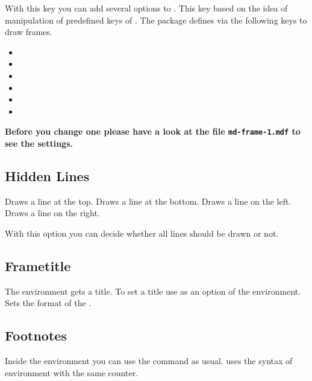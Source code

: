 \documentclass[parskip=false,english,11pt]{ltxmdf}
\begin{document}
 With this key you can add several options to . This key based on the idea of manipulation of predefined keys of \mdname.
The package \mdname defines via  the following keys to draw frames.
\begin{itemize}
 \item {}
 \item {}
 \item {}
 \item {}
 \item {}
 \item {}
\end{itemize}
\textbf{Before you change one please have a look at the file \texttt{md-frame-1.mdf} to see the settings.}\limitation

\subsection{Hidden Lines}


 Draws a line at the top.
 Draws a line at the bottom.
 Draws a line on the left.
 Draws a line on the right.

 With this option you can decide whether all lines should be drawn or not. 

\subsection{Frametitle}


 The environment gets a title. To set a title use  as an option of the environment.
 Sets the format of the .

\subsection{Footnotes}
Inside the environment you can use the command  as usual. \mdname uses the syntax of environment  with the same counter.
\end{document}
